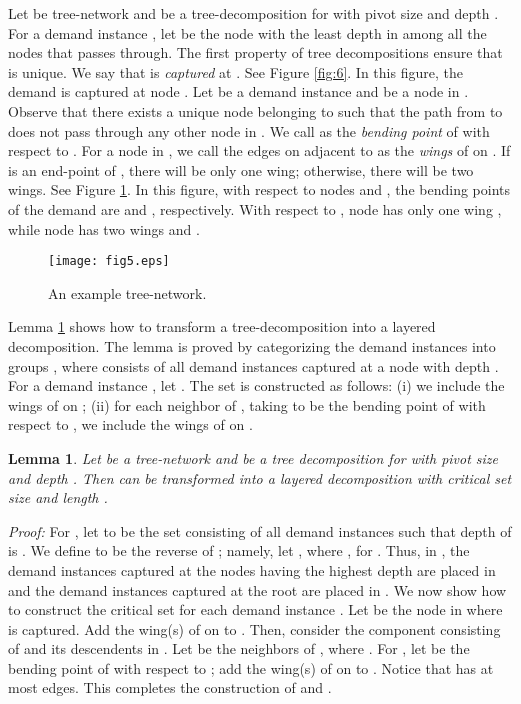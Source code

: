 \documentclass[11pt]{article}
\newtheorem{lemma}[theorem]{\bf Lemma}
\newcommand{\proof} {{\it Proof: }}
\begin{document}
Let  be tree-network and  be a tree-decomposition for 
with pivot size  and depth . 
For a demand instance , let 
be the node with the least depth in  among all the nodes that  passes through.
The first property of tree decompositions ensure that  is unique.
We say that  is {\em captured} at . See Figure \ref{fig:6}.
In this figure, the demand  is captured at node .
Let  be a demand instance and  be a node in .
Observe that there exists a unique node  belonging to 
such that the path from  to  does not pass through any other node in .
We call  as the {\em bending point} of  with respect to .
For a node  in , we call the edges on  adjacent to  as the {\em wings} of  on .
If  is an end-point of , there will be only one wing; otherwise, there will be two wings.
See Figure \ref{fig:5}.
In this figure, with respect to nodes  and , 
the bending points of the demand  are  and , respectively.
With respect to , node  has only one wing , while node
 has two wings  and .

\begin{figure}
\centering
\texttt{[image: fig5.eps]}
\caption{
An example tree-network. 
}
\label{fig:5}
\end{figure}

Lemma \ref{lem:CCC} shows how to transform a tree-decomposition into a layered decomposition.
The lemma is proved by categorizing the demand instances into groups
, where  consists of all demand instances
captured at a node with depth .
For a demand instance , let .
The set  is constructed as follows:
(i) we include the wings of  on ;
(ii) for each neighbor  of , taking  to be the bending point of 
with respect to , we include the wings of  on .

\begin{lemma}
\label{lem:CCC}
Let  be a tree-network and  be a tree decomposition for 
with pivot size  and depth . Then  can be transformed into a layered
decomposition  with critical set size 
and length .
\end{lemma}
\proof
For , let  to be the set consisting of all demand instances 
 such that depth of  is . 
We define  to be the reverse of ;
namely, let , where , for .
Thus, in , the demand instances captured at the nodes having the highest depth are placed in 
and the demand instances captured at the root are placed in .
We now show how to construct the critical set  for each demand instance .
Let  be the node in  where  is captured.
Add the wing(s) of  on  to .
Then, consider the component  consisting of  and its descendents in .
Let  be the neighbors of , where .
For , let  be the bending point of  with respect to ;
add the wing(s) of  on  to . 
Notice that  has at most  edges.
This completes the construction of  and .
\end{document}
